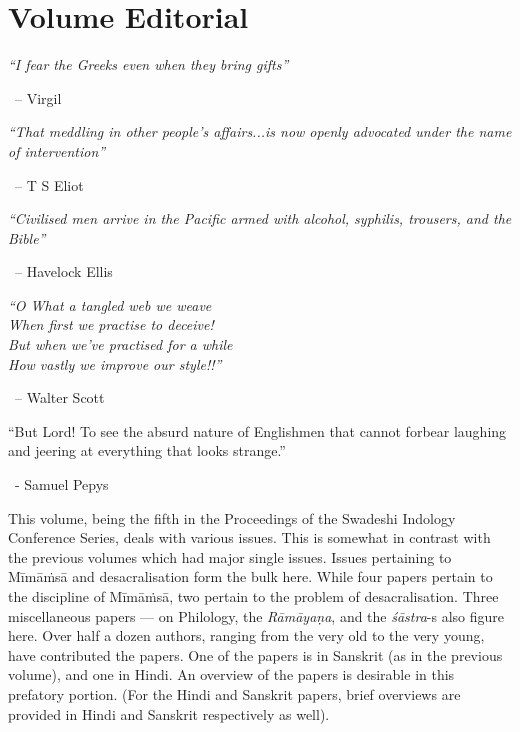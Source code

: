 \chapter*{Volume Editorial}\label{volumeeditorial}

\begin{myquote}
\textit{“I fear the Greeks even when they bring gifts”} 

~\hfill – Virgil
\end{myquote}

\begin{myquote}
\textit{“That meddling in other people’s affairs...}\newline \textit{is now openly advocated under the name of intervention”} 

~\hfill – T S Eliot
\end{myquote}

\begin{myquote}
\textit{“Civilised men arrive in the Pacific armed with alcohol, syphilis, trousers, and the Bible”} 

~\hfill – Havelock Ellis
\end{myquote}

\begin{myquote}
\textit{“O What a tangled web we weave\\ When first we practise to deceive!\\ But when we’ve practised for a while\\ How vastly we improve our style!!”} 

~\hfill – Walter Scott
\end{myquote}

\begin{myquote}
“But Lord! To see the absurd nature of Englishmen that cannot forbear laughing and jeering at everything that looks strange.” 

~\hfill - Samuel Pepys
\end{myquote}

This volume, being the fifth in the Proceedings of the Swadeshi Indology Conference Series, deals with various issues. This is somewhat in contrast with the previous volumes which had major single issues. Issues pertaining to Mīmāṁsā and desacralisation form the bulk here. While four papers pertain to the discipline of Mīmāṁsā, two pertain to the problem of desacralisation. Three miscellaneous papers — on Philology,
 the \textit{Rāmāyaṇa}, and the \textit{śāstra}-s also figure here. Over half a dozen authors, ranging from the very old to the very young, have contributed the papers. One of the papers is in Sanskrit (as in the previous volume), and one in Hindi. An overview of the papers is desirable in this prefatory portion. (For the Hindi and Sanskrit papers, brief overviews are provided in Hindi and Sanskrit respectively as well).

